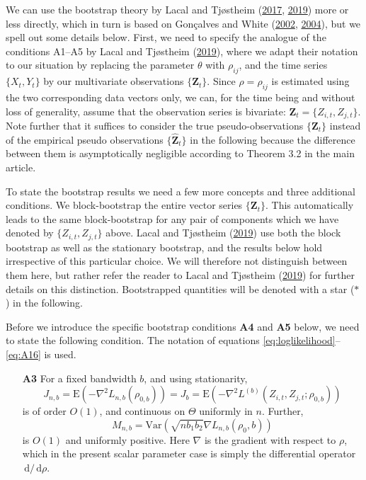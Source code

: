 \documentclass[
  12pt,
  letterpaper]{article}
\numberwithin{equation}{section}
\newcommand{\Z}{\bm{Z}}
\newcommand{\hZ}{\widehat{\bm{Z}}}
\newcommand{\E}{\textrm{E}}
\newcommand{\Var}{\textrm{Var}}
\newcommand{\di}{\,\textrm{d}}
\begin{document}
We can use the bootstrap theory by Lacal and Tjøstheim (\protect\hyperlink{ref-lacal2017local}{2017}, \protect\hyperlink{ref-lacal2018estimating}{2019}) more or less directly, which in turn is based on Gon\c{c}alves and White (\protect\hyperlink{ref-gonccalves2002bootstrap}{2002}, \protect\hyperlink{ref-gonccalves2004maximum}{2004}), but we spell out some details below. First, we need to specify the analogue of the conditions A1--A5 by Lacal and Tjøstheim (\protect\hyperlink{ref-lacal2018estimating}{2019}), where we adapt their notation to our situation by replacing the parameter \(\theta\) with \(\rho_{ij}\), and the time series \(\{X_t, Y_t\}\) by our multivariate observations \(\{\Z_t\}\). Since \(\rho = \rho_{ij}\) is estimated using the two corresponding data vectors only, we can, for the time being and without loss of generality, assume that the observation series is bivariate: \({\Z_t} = \{Z_{i,t}, Z_{j,t}\}\). Note further that it suffices to consider the true pseudo-observations \(\{\Z_t\}\) instead of the empirical pseudo observations \(\{\hZ_t\}\) in the following because the difference between them is asymptotically negligible according to Theorem 3.2 in the main article.

To state the bootstrap results we need a few more concepts and three additional conditions. We block-bootstrap the entire vector series \(\{\Z_t\}\). This automatically leads to the same block-bootstrap for any pair of components which we have denoted by \(\{Z_{i,t}, Z_{j,t}\}\) above. Lacal and Tjøstheim (\protect\hyperlink{ref-lacal2018estimating}{2019}) use both the block bootstrap as well as the stationary bootstrap, and the results below hold irrespective of this particular choice. We will therefore not distinguish between them here, but rather refer the reader to Lacal and Tjøstheim (\protect\hyperlink{ref-lacal2018estimating}{2019}) for further details on this distinction. Bootstrapped quantities will be denoted with a star (\(*\)) in the following.

Before we introduce the specific bootstrap conditions \textbf{A4} and \textbf{A5} below, we need to state the following condition. The notation of equations \eqref{eq:loglikelihood}--\eqref{eq:A16} is used.

\begin{itemize}
\item[\textbf{A3}] For a fixed bandwidth $b$, and using stationarity,
$$J_{n,b} = \E\left(-\nabla^2L_{n,b}(\rho_{0,b})\right) = J_b = \E\left(-\nabla^2 L^{(b)}(Z_{i,t}, Z_{j,t};\rho_{0,b})\right)$$
is of order $O(1)$, and continuous on $\Theta$ uniformly in $n$. Further,
$$M_{n,b} = \Var\left(\sqrt{nb_1b_2}\nabla L_{n,b}(\rho_0,b)\right)$$
is $O(1)$ and uniformly positive. Here $\nabla$ is the gradient with respect to $\rho$, which in the present scalar parameter case is simply the differential operator $\di/\di\rho$.
\end{itemize}
\end{document}
